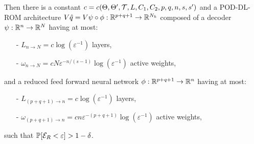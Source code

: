 \begin{theorem}
    Then there is a constant $c = c(\Theta, \Theta', \mathcal{T}, L, C_1, C_2, p, q, n, s, s')$ and a POD-DL-ROM architecture $V \hat{q} =
    V \psi \circ \phi: \mathbb{R}^{p+q+1} \to \mathbb{R}^{N_h}$ composed of a decoder $\psi: \mathbb{R}^n \to \mathbb{R}^N$ having at most:
    \begin{enumerate}
        \item[-] $L_{n \to N} = c \log(\varepsilon^{-1})$ layers,
        \item[-] $\omega_{n \to N} = cN \varepsilon^{-n/(s-1)} \log(\varepsilon^{-1})$ active weights,
    \end{enumerate}
    and a reduced feed forward neural network $\phi: \mathbb{R}^{p+q+1} \to \mathbb{R}^n$ having at most:
    \begin{enumerate}
        \item[-] $L_{(p+q+1) \to n} = c \log(\varepsilon^{-1})$ layers,
        \item[-] $\omega_{(p+q+1) \to n} = cn \varepsilon^{-(p+q+1)} \log(\varepsilon^{-1})$ active weights,
    \end{enumerate}
    such that $\mathbb{P}[\mathcal{E}_R < \varepsilon] > 1 - \delta$.
\end{theorem}

